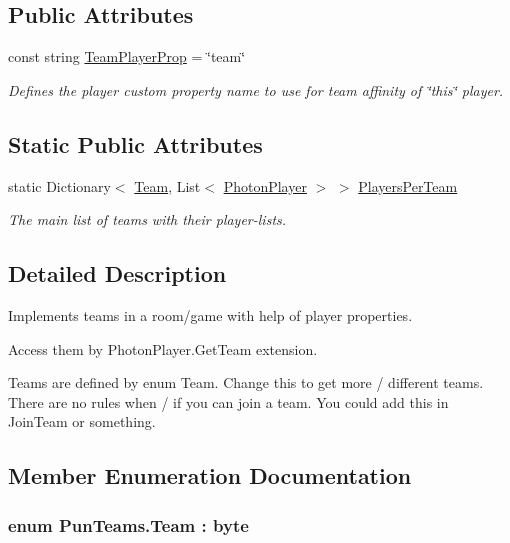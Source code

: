 \subsection*{Public Attributes}
\begin{DoxyCompactItemize}
\item 
const string \hyperlink{class_pun_teams_a036c6f1b595a3a4d3df5dc6566950667}{Team\+Player\+Prop} = \char`\"{}team\char`\"{}
\begin{DoxyCompactList}\small\item\em Defines the player custom property name to use for team affinity of \char`\"{}this\char`\"{} player.\end{DoxyCompactList}\end{DoxyCompactItemize}
\subsection*{Static Public Attributes}
\begin{DoxyCompactItemize}
\item 
static Dictionary$<$ \hyperlink{class_pun_teams_a933d84000474f43931805990b241a2a7}{Team}, List$<$ \hyperlink{class_photon_player}{Photon\+Player} $>$ $>$ \hyperlink{class_pun_teams_a96cd4b32e4cd5a4447c10f2a3f22a22a}{Players\+Per\+Team}
\begin{DoxyCompactList}\small\item\em The main list of teams with their player-\/lists. \end{DoxyCompactList}\end{DoxyCompactItemize}


\subsection{Detailed Description}
Implements teams in a room/game with help of player properties. 

Access them by Photon\+Player.\+Get\+Team extension. 

Teams are defined by enum Team. Change this to get more / different teams. There are no rules when / if you can join a team. You could add this in Join\+Team or something. 

\subsection{Member Enumeration Documentation}
\subsubsection[{\texorpdfstring{Team}{Team}}]{\setlength{\rightskip}{0pt plus 5cm}enum {\bf Pun\+Teams.\+Team} \+: byte\hspace{0.3cm}{\ttfamily [strong]}}\hypertarget{class_pun_teams_a933d84000474f43931805990b241a2a7}{}\label{class_pun_teams_a933d84000474f43931805990b241a2a7}


